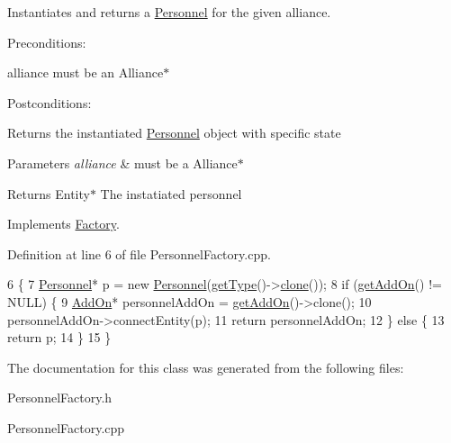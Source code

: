 Instantiates and returns a \hyperlink{classPersonnel}{Personnel} for the given alliance. 

Preconditions\+:
\begin{DoxyItemize}
\item alliance must be an Alliance$\ast$
\end{DoxyItemize}

Postconditions\+:
\begin{DoxyItemize}
\item Returns the instantiated \hyperlink{classPersonnel}{Personnel} object with specific state
\end{DoxyItemize}


\begin{DoxyParams}{Parameters}
{\em alliance} & must be a Alliance$\ast$ \\
\hline
\end{DoxyParams}
\begin{DoxyReturn}{Returns}
Entity$\ast$ The instatiated personnel 
\end{DoxyReturn}


Implements \hyperlink{classFactory}{Factory}.



Definition at line 6 of file Personnel\+Factory.\+cpp.


\begin{DoxyCode}
6                                                          \{
7     \hyperlink{classPersonnel}{Personnel}* p = \textcolor{keyword}{new} \hyperlink{classPersonnel}{Personnel}(\hyperlink{classFactory_ac91051006ace7ec5bb6ecf0fe6d02d58}{getType}()->\hyperlink{classPersonnelFactory_ad60e8371e52153294112b16a7a97cc2d}{clone}());
8     \textcolor{keywordflow}{if} (\hyperlink{classFactory_a994153930f59cafb280e91d5b100b5aa}{getAddOn}() != NULL) \{
9         \hyperlink{classAddOn}{AddOn}* personnelAddOn = \hyperlink{classFactory_a994153930f59cafb280e91d5b100b5aa}{getAddOn}()->clone();
10         personnelAddOn->connectEntity(p);
11         \textcolor{keywordflow}{return} personnelAddOn;
12     \} \textcolor{keywordflow}{else} \{
13         \textcolor{keywordflow}{return} p;
14     \}
15 \}
\end{DoxyCode}


The documentation for this class was generated from the following files\+:\begin{DoxyCompactItemize}
\item 
Personnel\+Factory.\+h\item 
Personnel\+Factory.\+cpp\end{DoxyCompactItemize}
